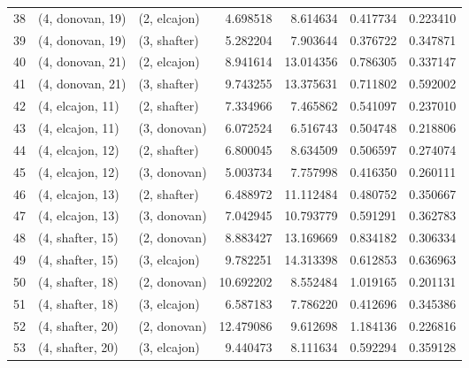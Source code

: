 \begin{tabular}{lllrrrr}
38 &  (4, donovan, 19) &     (2, elcajon) &   4.698518 &   8.614634 &   0.417734 &  0.223410 \\
39 &  (4, donovan, 19) &     (3, shafter) &   5.282204 &   7.903644 &   0.376722 &  0.347871 \\
40 &  (4, donovan, 21) &     (2, elcajon) &   8.941614 &  13.014356 &   0.786305 &  0.337147 \\
41 &  (4, donovan, 21) &     (3, shafter) &   9.743255 &  13.375631 &   0.711802 &  0.592002 \\
42 &  (4, elcajon, 11) &     (2, shafter) &   7.334966 &   7.465862 &   0.541097 &  0.237010 \\
43 &  (4, elcajon, 11) &     (3, donovan) &   6.072524 &   6.516743 &   0.504748 &  0.218806 \\
44 &  (4, elcajon, 12) &     (2, shafter) &   6.800045 &   8.634509 &   0.506597 &  0.274074 \\
45 &  (4, elcajon, 12) &     (3, donovan) &   5.003734 &   7.757998 &   0.416350 &  0.260111 \\
46 &  (4, elcajon, 13) &     (2, shafter) &   6.488972 &  11.112484 &   0.480752 &  0.350667 \\
47 &  (4, elcajon, 13) &     (3, donovan) &   7.042945 &  10.793779 &   0.591291 &  0.362783 \\
48 &  (4, shafter, 15) &     (2, donovan) &   8.883427 &  13.169669 &   0.834182 &  0.306334 \\
49 &  (4, shafter, 15) &     (3, elcajon) &   9.782251 &  14.313398 &   0.612853 &  0.636963 \\
50 &  (4, shafter, 18) &     (2, donovan) &  10.692202 &   8.552484 &   1.019165 &  0.201131 \\
51 &  (4, shafter, 18) &     (3, elcajon) &   6.587183 &   7.786220 &   0.412696 &  0.345386 \\
52 &  (4, shafter, 20) &     (2, donovan) &  12.479086 &   9.612698 &   1.184136 &  0.226816 \\
53 &  (4, shafter, 20) &     (3, elcajon) &   9.440473 &   8.111634 &   0.592294 &  0.359128 \\
\bottomrule
\end{tabular}
